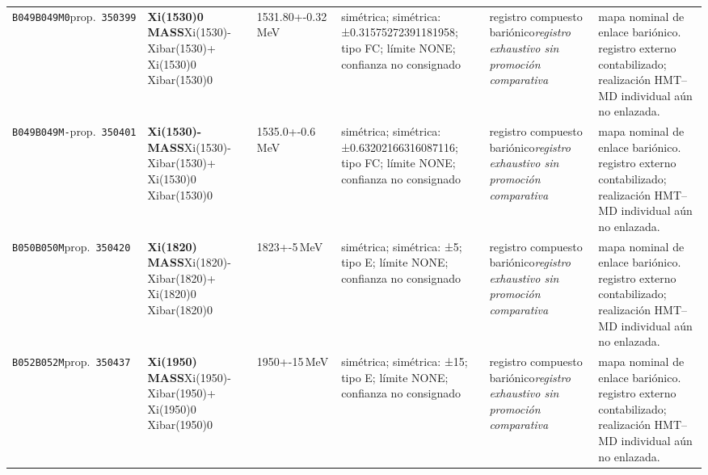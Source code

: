 \begin{landscape}
\begin{longtable}{L{1.85cm}L{4.45cm}L{2.35cm}L{4.05cm}L{3.35cm}L{7.15cm}}
\texttt{B049}\newline \texttt{B049M0}\newline prop.\ \texttt{350399} & \textbf{Xi(1530)0 MASS}\newline Xi(1530)- \textbar{}\allowbreak{} Xibar(1530)+ \textbar{}\allowbreak{} Xi(1530)0 \textbar{}\allowbreak{} Xibar(1530)0 & 1531.80+-0.32\,MeV & simétrica; simétrica: ±0.31575272391181958; tipo FC; límite NONE; confianza no consignado & registro compuesto bariónico\newline \emph{registro exhaustivo sin promoción comparativa} & mapa nominal de enlace bariónico. registro externo contabilizado; realización HMT--MD individual aún no enlazada. \\
\texttt{B049}\newline \texttt{B049M-}\newline prop.\ \texttt{350401} & \textbf{Xi(1530)- MASS}\newline Xi(1530)- \textbar{}\allowbreak{} Xibar(1530)+ \textbar{}\allowbreak{} Xi(1530)0 \textbar{}\allowbreak{} Xibar(1530)0 & 1535.0+-0.6\,MeV & simétrica; simétrica: ±0.63202166316087116; tipo FC; límite NONE; confianza no consignado & registro compuesto bariónico\newline \emph{registro exhaustivo sin promoción comparativa} & mapa nominal de enlace bariónico. registro externo contabilizado; realización HMT--MD individual aún no enlazada. \\
\texttt{B050}\newline \texttt{B050M}\newline prop.\ \texttt{350420} & \textbf{Xi(1820) MASS}\newline Xi(1820)- \textbar{}\allowbreak{} Xibar(1820)+ \textbar{}\allowbreak{} Xi(1820)0 \textbar{}\allowbreak{} Xibar(1820)0 & 1823+-5\,MeV & simétrica; simétrica: ±5; tipo E; límite NONE; confianza no consignado & registro compuesto bariónico\newline \emph{registro exhaustivo sin promoción comparativa} & mapa nominal de enlace bariónico. registro externo contabilizado; realización HMT--MD individual aún no enlazada. \\
\texttt{B052}\newline \texttt{B052M}\newline prop.\ \texttt{350437} & \textbf{Xi(1950) MASS}\newline Xi(1950)- \textbar{}\allowbreak{} Xibar(1950)+ \textbar{}\allowbreak{} Xi(1950)0 \textbar{}\allowbreak{} Xibar(1950)0 & 1950+-15\,MeV & simétrica; simétrica: ±15; tipo E; límite NONE; confianza no consignado & registro compuesto bariónico\newline \emph{registro exhaustivo sin promoción comparativa} & mapa nominal de enlace bariónico. registro externo contabilizado; realización HMT--MD individual aún no enlazada. \\

\end{longtable}
\end{landscape}
